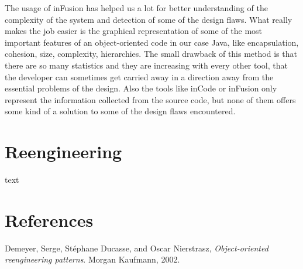 \documentclass{article}
\begin{document}
The usage of inFusion has helped us a lot for better understanding of the complexity of the system and detection of some of the design flaws. What really makes the job easier is the graphical representation of some of the most important features of an object-oriented code in our case Java, like encapsulation, cohesion, size, complexity, hierarchies. The small drawback of this method is that there are so many statistics and they are increasing with every other tool, that the developer can sometimes get carried away in a direction away from the essential problems of the design. Also the tools like inCode or inFusion only represent the information collected from the source code, but none of them offers some kind of a solution to some of the design flaws encountered.

\section{Reengineering}
text

\section{References}
\begin{thebibliography}{9}

	Demeyer, Serge, St{\'e}phane Ducasse, and Oscar Nierstrasz,
	\emph{Object-oriented reengineering patterns}. 
	Morgan Kaufmann, 
	2002.

\end{thebibliography}
\end{document}
